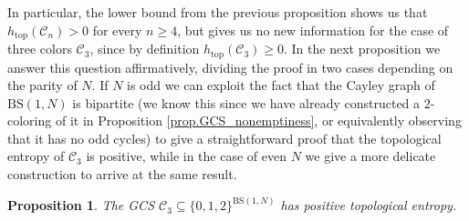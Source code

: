 \documentclass[letterpaper,10pt]{article}
\theoremstyle{plain}
\newtheorem{proposition}[theorem]{Proposition}
\newcommand{\BS}[1][N]{\mathrm{BS}(1,#1)}
\def\htop{h_{\mathrm{top}}}
\begin{document}
In particular, the lower bound from the previous proposition shows us that $\htop(\mathcal{C}_n)>0$ for every $n\ge 4$, but gives us no new information for the case of three colors $\mathcal{C}_3$, since by definition $\htop(\mathcal{C}_3)\ge 0$. In the next proposition we answer this question affirmatively, dividing the proof in two cases depending on the parity of $N$. If $N$ is odd we can exploit the fact that the Cayley graph of $\BS$ is bipartite (we know this since we have already constructed a $2$-coloring of it in Proposition \ref{prop.GCS_nonemptiness}, or equivalently observing that it has no odd cycles) to give a straightforward proof that the topological entropy of $\mathcal{C}_3$ is positive, while in the case of even $N$ we give a more delicate construction to arrive at the same result.
\begin{proposition} The GCS $\mathcal{C}_3\subseteq \{0,1,2\}^{\BS}$ has positive topological entropy.
\end{proposition}
\end{document}
